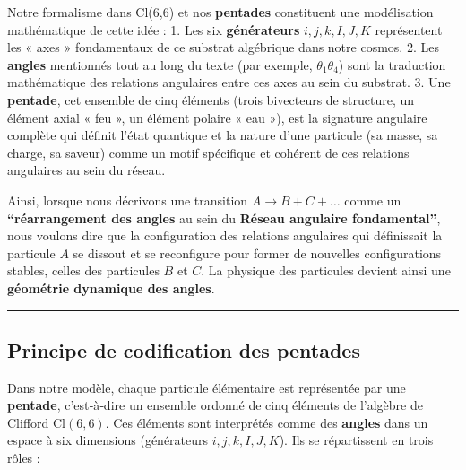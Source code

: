 \documentclass[11pt]{article}
\begin{document}
Notre formalisme dans Cl(6,6) et nos \textbf{pentades} constituent une
modélisation mathématique de cette idée : 1. Les six
\textbf{générateurs} \(i,j,k,I,J,K\) représentent les « axes »
fondamentaux de ce substrat algébrique dans notre cosmos. 2. Les
\textbf{angles} mentionnés tout au long du texte (par exemple,
\(\theta_1\theta_4\)) sont la traduction mathématique des relations
angulaires entre ces axes au sein du substrat. 3. Une \textbf{pentade},
cet ensemble de cinq éléments (trois bivecteurs de structure, un élément
axial « feu », un élément polaire « eau »), est la signature angulaire
complète qui définit l'état quantique et la nature d'une particule (sa
masse, sa charge, sa saveur) comme un motif spécifique et cohérent de
ces relations angulaires au sein du réseau.

Ainsi, lorsque nous décrivons une transition \(A \to B + C + \dots\)
comme un \textbf{``réarrangement des angles} au sein du \textbf{Réseau
angulaire fondamental''}, nous voulons dire que la configuration des
relations angulaires qui définissait la particule \(A\) se dissout et se
reconfigure pour former de nouvelles configurations stables, celles des
particules \(B\) et \(C\). La physique des particules devient ainsi une
\textbf{géométrie dynamique des angles}.

\begin{center}\rule{0.5\linewidth}{0.5pt}\end{center}

\hypertarget{principe-de-codification-des-pentades}{%
\subsection{Principe de codification des
pentades}\label{principe-de-codification-des-pentades}}

Dans notre modèle, chaque particule élémentaire est représentée par une
\textbf{pentade}, c'est‑à‑dire un ensemble ordonné de cinq éléments de
l'algèbre de Clifford \(\text{Cl}(6,6)\). Ces éléments sont interprétés
comme des \textbf{angles} dans un espace à six dimensions (générateurs
\(i,j,k,I,J,K\)). Ils se répartissent en trois rôles :
\end{document}
